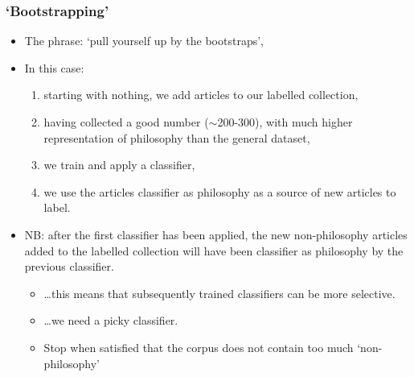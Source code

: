 \documentclass[10pt, compress]{beamer}
\begin{document}
\begin{frame}
	\frametitle{`Bootstrapping'}

	\pause

  \begin{itemize}[<+- | alert@+>]
		\item The phrase: `pull yourself up by the bootstraps',
		\item In this case:
		\begin{enumerate}
			\item starting with nothing, we add articles to our labelled collection,
			\item having collected a good number ($\sim$200-300), with much higher representation of philosophy than the general dataset,
			\item we train and apply a classifier,
			\item we use the articles classifier as philosophy as a source of new articles to label.
		\end{enumerate}
		\item NB: after the first classifier has been applied, the new non-philosophy articles added to the labelled collection will have been classifier as philosophy by the previous classifier.
		\begin{itemize}
		\item \ldots this means that subsequently trained classifiers can be more selective.
		\item \ldots we need a picky classifier.
		\item Stop when satisfied that the corpus does not contain too much `non-philosophy'
		\end{itemize}
	\end{itemize}

\end{frame}
\end{document}
